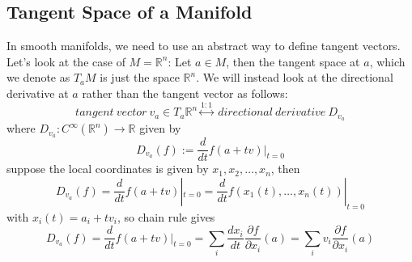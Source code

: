 \documentclass[11pt]{article}
\newcommand{\bb}[1]{\mathbb{#1}}
\begin{document}
\subsection{Tangent Space of a Manifold} In smooth manifolds, we need to use an abstract way to define tangent vectors. Let's look at the case of $M = \bb{R}^n$:
Let $a \in M$, then the tangent space at $a$, which we denote as $T_aM$ is just the space $\bb{R}^n$. We will instead look at the directional derivative at $a$ rather than the tangent vector as follows:
$$tangent\ vector\ v_a \in T_a\bb{R}^n \stackrel{1:1}{\longleftrightarrow}\ directional\ derivative\ D_{v_a}$$
where $D_{v_a}: C^{\infty}(\bb{R}^n) \to \bb{R}$ given by
$$D_{v_a}(f) := \frac{d}{dt}f(a+tv)|_{t = 0}$$
suppose the local coordinates is given by $x_1, x_2, \dots, x_n$, then
$$D_{v_a}(f) = \frac{d}{dt}f(a+tv)|_{t = 0} = \frac{d}{dt}f(x_1(t), \dots, x_n(t))|_{t = 0}$$
with $x_i(t) = a_i + tv_i$, so chain rule gives
$$D_{v_a}(f) = \frac{d}{dt}f(a+tv)|_{t = 0} = \sum_i \frac{dx_i}{dt}\frac{\partial f}{\partial x_i}(a) = \sum_i v_i\frac{\partial f}{\partial x_i}(a)$$
\end{document}
